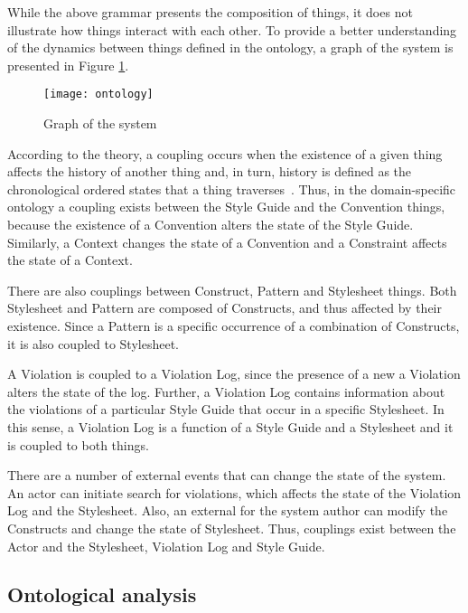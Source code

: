 \documentclass[parskip=full]{uvamscse}
\begin{document}
While the above grammar presents the composition of things, it does not illustrate how things
interact with each other. To provide a better understanding of the dynamics between things defined
in the ontology, a graph of the system is presented in Figure \ref{fig:couplings}.

\begin{figure}[h!]
  \centering
  \caption{Graph of the system}
  \label{fig:couplings}
  \texttt{[image: ontology]}
\end{figure}

According to the theory, a coupling occurs when the existence of a given thing affects the history
of another thing and, in turn, history is defined as the chronological ordered states that a thing
traverses~\cite{wand1990ontological}. Thus, in the domain-specific ontology a coupling exists
between the Style Guide and the Convention things, because the existence of a Convention alters the
state of the Style Guide. Similarly, a Context changes the state of a Convention and a Constraint
affects the state of a Context.

There are also couplings between Construct, Pattern and Stylesheet things. Both Stylesheet and
Pattern are composed of Constructs, and thus affected by their existence. Since a Pattern is a
specific occurrence of a combination of Constructs, it is also coupled to Stylesheet.

A Violation is coupled to a Violation Log, since the presence of a new a Violation alters the state
of the log. Further, a Violation Log contains information about the violations of a particular Style
Guide that occur in a specific Stylesheet. In this sense, a Violation Log is a function of a Style
Guide and a Stylesheet and it is coupled to both things.

There are a number of external events that can change the state of the system. An actor can initiate search for violations, which affects the state of the Violation Log and the Stylesheet. Also, an external for the system author can modify the Constructs and change the state of Stylesheet. Thus, couplings exist between the Actor and the Stylesheet, Violation Log and Style Guide.

\subsection{Ontological analysis}
\end{document}
